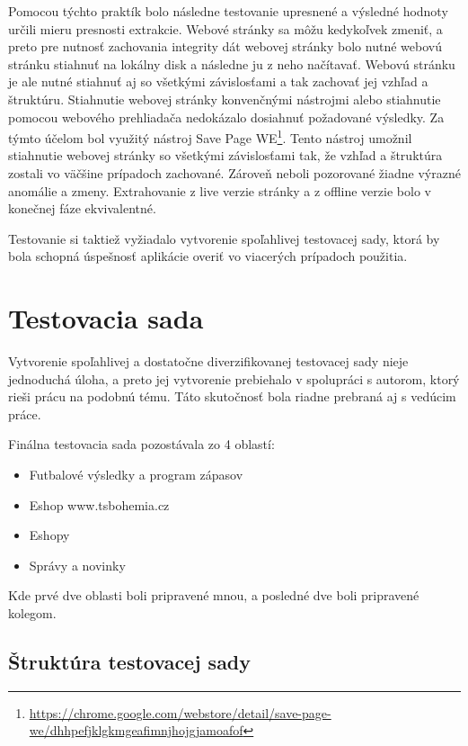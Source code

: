 Pomocou týchto praktík bolo následne testovanie upresnené a výsledné hodnoty určili mieru presnosti extrakcie. Webové stránky sa môžu kedykoľvek zmeniť, a preto pre nutnosť zachovania integrity dát webovej stránky bolo nutné webovú stránku stiahnuť na lokálny disk a následne ju z neho načítavať. Webovú stránku je ale nutné stiahnuť aj so všetkými závislosťami a tak zachovať jej vzhľad a štruktúru. Stiahnutie webovej stránky konvenčnými nástrojmi alebo stiahnutie pomocou webového prehliadača nedokázalo dosiahnuť požadované výsledky. Za týmto účelom bol využitý nástroj Save Page WE\footnote{\url{https://chrome.google.com/webstore/detail/save-page-we/dhhpefjklgkmgeafimnjhojgjamoafof}}. Tento nástroj umožnil stiahnutie webovej stránky so všetkými závislosťami tak, že vzhľad a štruktúra zostali vo väčšine prípadoch zachované. Zároveň neboli pozorované žiadne výrazné anomálie a zmeny. Extrahovanie z live verzie stránky a z offline verzie bolo v konečnej fáze ekvivalentné. 

Testovanie si taktiež vyžiadalo vytvorenie spoľahlivej testovacej sady, ktorá by bola schopná úspešnosť aplikácie overiť vo viacerých prípadoch použitia. 

\section{Testovacia sada}
\label{dataset}

Vytvorenie spoľahlivej a dostatočne diverzifikovanej testovacej sady nieje jednoduchá úloha, a preto jej vytvorenie prebiehalo v spolupráci s autorom, ktorý rieši prácu na podobnú tému\cite{mastera}. Táto skutočnosť bola riadne prebraná aj s vedúcim práce.

Finálna testovacia sada pozostávala zo 4 oblastí:

\begin{itemize}
    \item Futbalové výsledky a program zápasov
    \item Eshop www.tsbohemia.cz
    \item Eshopy
    \item Správy a novinky
\end{itemize}

Kde prvé dve oblasti boli pripravené mnou, a posledné dve boli pripravené kolegom.

\subsection{Štruktúra testovacej sady}

